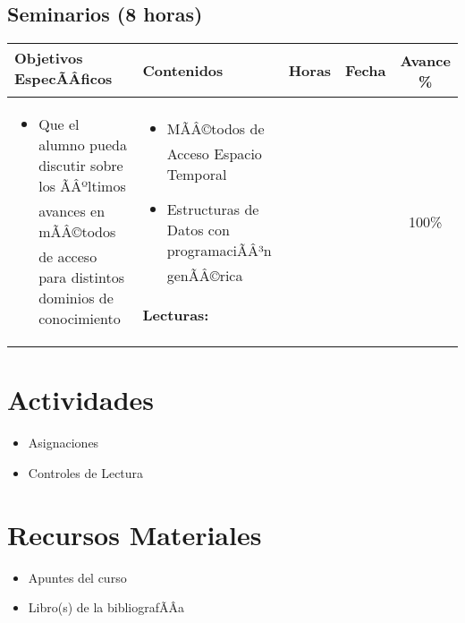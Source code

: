 \documentclass[a4paper]{article}
\newenvironment{unitgoals}
{ \begin{itemize} }
{ \end{itemize}   }
\newenvironment{topics}
{ \begin{itemize} }
{ \end{itemize}   }
\begin{document}
\subsection{Seminarios (8 horas)}
\begin{tabularx}{\textwidth}{|X|X|c|c|c|}
\hline
\textbf{Objetivos EspecÃÂ­ficos} &   \textbf{Contenidos} & \textbf{Horas} & \textbf{Fecha} & \textbf{Avance \%}  \\ \hline
\begin{unitgoals}
         \item Que el alumno pueda discutir sobre los ÃÂºltimos avances en mÃÂ©todos de acceso para distintos dominios de conocimiento
   \end{unitgoals}      &
\begin{topics}
         \item MÃÂ©todos de Acceso Espacio Temporal
         \item Estructuras de Datos con programaciÃÂ³n genÃÂ©rica
   \end{topics}
{\bf Lecturas:} \cite{Chavez:01} &
&
&
100\%
\\
\hline
\end{tabularx}




\section{Actividades}
\begin{itemize}
\item Asignaciones
\item Controles de Lectura
\end{itemize} 

\section{Recursos Materiales}
\begin{itemize}
\item Apuntes del curso
\item Libro(s) de la bibliografÃÂ­a
\end{itemize} 
\end{document}
